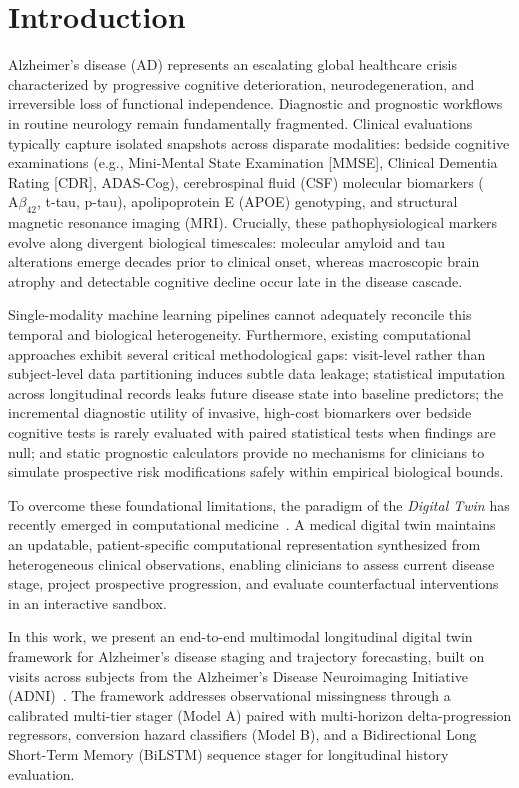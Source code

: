 \documentclass[11pt,a4paper]{article}
\begin{document}
\newpage

\section{Introduction}
\label{sec:introduction}
Alzheimer's disease (AD) represents an escalating global healthcare crisis characterized by progressive cognitive deterioration, neurodegeneration, and irreversible loss of functional independence. Diagnostic and prognostic workflows in routine neurology remain fundamentally fragmented. Clinical evaluations typically capture isolated snapshots across disparate modalities: bedside cognitive examinations (e.g., Mini-Mental State Examination [MMSE], Clinical Dementia Rating [CDR], ADAS-Cog), cerebrospinal fluid (CSF) molecular biomarkers ($\text{A}\beta_{42}$, t-tau, p-tau), apolipoprotein E (APOE) genotyping, and structural magnetic resonance imaging (MRI). Crucially, these pathophysiological markers evolve along divergent biological timescales: molecular amyloid and tau alterations emerge decades prior to clinical onset, whereas macroscopic brain atrophy and detectable cognitive decline occur late in the disease cascade.

Single-modality machine learning pipelines cannot adequately reconcile this temporal and biological heterogeneity. Furthermore, existing computational approaches exhibit several critical methodological gaps: visit-level rather than subject-level data partitioning induces subtle data leakage; statistical imputation across longitudinal records leaks future disease state into baseline predictors; the incremental diagnostic utility of invasive, high-cost biomarkers over bedside cognitive tests is rarely evaluated with paired statistical tests when findings are null; and static prognostic calculators provide no mechanisms for clinicians to simulate prospective risk modifications safely within empirical biological bounds.

To overcome these foundational limitations, the paradigm of the \textit{Digital Twin} has recently emerged in computational medicine~\cite{nasem2023digitaltwins}. A medical digital twin maintains an updatable, patient-specific computational representation synthesized from heterogeneous clinical observations, enabling clinicians to assess current disease stage, project prospective progression, and evaluate counterfactual interventions in an interactive sandbox.

In this work, we present an end-to-end multimodal longitudinal digital twin framework for Alzheimer's disease staging and trajectory forecasting, built on \TotalRows{} visits across \TotalSubjects{} subjects from the Alzheimer's Disease Neuroimaging Initiative (ADNI)~\cite{petersen2010adni}. The framework addresses observational missingness through a calibrated multi-tier stager (Model A) paired with multi-horizon delta-progression regressors, conversion hazard classifiers (Model B), and a Bidirectional Long Short-Term Memory (BiLSTM) sequence stager for longitudinal history evaluation.
\end{document}
